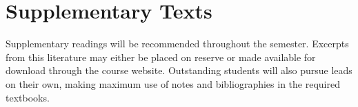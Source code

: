 \documentclass[titlepage]{article}
\begin{document}
\section{Supplementary Texts}
\label{supplementary}

Supplementary readings will be recommended throughout the semester.
Excerpts from this literature may either be placed on reserve or made
available for download through the course website. Outstanding students
will also pursue leads on their own, making maximum use of notes and
bibliographies in the required textbooks.

%
%
%
%
%
%
%
\end{document}
